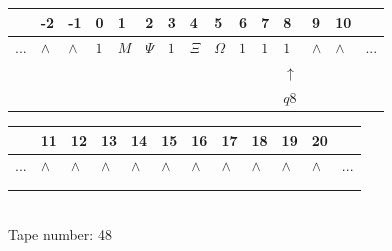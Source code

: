 \documentclass[11pt]{article}
\begin{document}
\begin{table}[H]
\centering
\begin{tabular}{lllllllllllllll}
 & -2 & -1 & 0 & 1 & 2 & 3 & 4 & 5 & 6 & 7 & 8 & 9 & 10 & \\
\hline
$...$ & \multicolumn{1}{|l|}{$\wedge$} & \multicolumn{1}{|l|}{$\wedge$} & \multicolumn{1}{|l|}{$1$} & \multicolumn{1}{|l|}{$M$} & \multicolumn{1}{|l|}{$\Psi$} & \multicolumn{1}{|l|}{$1$} & \multicolumn{1}{|l|}{$\Xi$} & \multicolumn{1}{|l|}{$\Omega$} & \multicolumn{1}{|l|}{$1$} & \multicolumn{1}{|l|}{$1$} & \multicolumn{1}{|l|}{$1$} & \multicolumn{1}{|l|}{$\wedge$} & \multicolumn{1}{|l|}{$\wedge$} & $...$\\
\hline
&  &  &  &  &  &  &  &  &  &  & $\uparrow$ &  &  &  \\
&  &  &  &  &  &  &  &  &  &  & $ q8 $ &  &  &  \\
\end{tabular}
\begin{tabular}{llllllllllll}
 & 11 & 12 & 13 & 14 & 15 & 16 & 17 & 18 & 19 & 20 & \\
\hline
$...$ & \multicolumn{1}{|l|}{$\wedge$} & \multicolumn{1}{|l|}{$\wedge$} & \multicolumn{1}{|l|}{$\wedge$} & \multicolumn{1}{|l|}{$\wedge$} & \multicolumn{1}{|l|}{$\wedge$} & \multicolumn{1}{|l|}{$\wedge$} & \multicolumn{1}{|l|}{$\wedge$} & \multicolumn{1}{|l|}{$\wedge$} & \multicolumn{1}{|l|}{$\wedge$} & \multicolumn{1}{|l|}{$\wedge$} & $...$\\
\hline
&  &  &  &  &  &  &  &  &  &  &  \\
&  &  &  &  &  &  &  &  &  &  &  \\
\end{tabular}
\\
Tape number: 48
\noindent\makebox[\linewidth]{\hdashrule{\textwidth}{1pt}{1pt}}\end{table}
\end{document}
